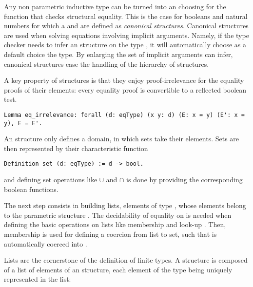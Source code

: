 Any non parametric inductive type can be turned
into an  choosing for \C{==} the function that
checks structural equality.
This is the case for booleans and natural numbers for which a  
and  are defined as {\it canonical structures}. Canonical
structures are used when solving equations involving 
implicit arguments. Namely, if the type
checker needs to infer an  structure on the type
, it will automatically choose as a default choice the 
type. By enlarging the set of implicit arguments \Coq{}
can infer, canonical structures ease the handling of the
hierarchy of structures.

A key property of  structures is that
they enjoy proof-irrelevance for the
equality proofs of their elements: every equality proof is
convertible to a reflected boolean test.

\begin{lstlisting}
Lemma eq_irrelevance: forall (d: eqType) (x y: d) (E: x = y) (E': x = y), E = E'.
\end{lstlisting}

%
%

An  structure only defines a domain, in which sets take their elements. Sets are 
then represented by their characteristic function 
\begin{lstlisting}
Definition set (d: eqType) := d -> bool.
\end{lstlisting}
and defining set operations like $\cup$ and $\cap$
is done by providing the corresponding boolean functions.

The next step consists in building lists, elements of type , 
whose elements belong to the parametric  structure . The decidability of equality
on  is needed when defining the basic operations on
lists like membership \C{\\in} and look-up . Then, membership
is used for defining a coercion from list to set, such
that  is automatically coerced into .

Lists are the cornerstone of the definition of finite types. 
A  structure is composed of a list of
elements of an  structure, each element of the
type being uniquely represented in the list:

